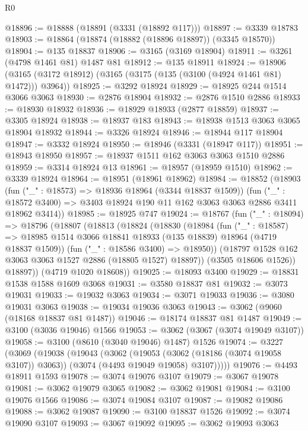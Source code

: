 \begin{lexlean}{R0}
\begin{coremodule}
@18896 := @18888 (@18891 (@3331 (@18892 @117)))
@18897 := @3339 @18783
@18903 := @18864 (@18874 (@18882 (@18896 @18897)) (@3345 @18570))
@18904 := @135 @18837
@18906 := @3165 (@3169 @18904)
@18911 := @3261 (@4798 @1461 @81) @1487 @81
@18912 := @135 @18911
@18924 := @18906 (@3165 (@3172 @18912) (@3165 (@3175 (@135 (@3100 (@4924 @1461 @81) @1472))) @3964))
@18925 := @3292 @18924
@18929 := @18925 @244 @1514 @3066 @3063
@18930 := @2876 @18904
@18932 := @2876 @1510 @2886
@18933 := @18930 @18932
@18936 := @18929 @18933 (@2877 @18859)
@18937 := @3305 @18924
@18938 := @18937 @183
@18943 := @18938 @1513 @3063 @3065 @18904 @18932
@18944 := @3326 @18924
@18946 := @18944 @117 @18904
@18947 := @3332 @18924
@18950 := @18946 (@3331 (@18947 @117))
@18951 := @18943 @18950
@18957 := @18937 @1511 @162 @3063 @3063 @1510 @2886
@18959 := @3314 @18924 @13
@18961 := @18957 (@18959 @1510)
@18962 := @3339 @18924
@18964 := @18951 (@18961 @18962)
@18984 := @18852
    (@18903
      (fun ("_" : @18573) => @18936 @18964 (@3344 @18837 @1509))
      (fun ("_" : @18572 @3400) => @3403 @18924 @190 @11 @162 @3063 @3063 @2886 @3411 @18962 @3414))
@18985 := @18925 @747
@19024 := @18767
    (fun ("_" : @18094) =>
    @18796
      (@18807
        (@18813
          (@18824
            (@18830
              (@18984
                (fun ("_" : @18587) =>
                @18985 @1514 @3066 @18841 @18933 (@135 @18839) @18964 (@4719 @18837 @1509))
                (fun ("_" : @18586 @3400) => @18950))
              (@18797 @1528 @162 @3063 @3063 @1527 @2886 (@18805 @1527) @18897))
            (@3505 @18606 @1526))
          @18897))
      (@4719 @1020 @18608))
@19025 := @18093 @3400
@19029 := @18831 @1538 @1588 @1609 @3068
@19031 := @3580 @18837 @81
@19032 := @3073 @19031
@19033 := @19032 @3063
@19034 := @3071 @19033
@19036 := @3080 @19031 @3063
@19038 := @19034 @19036 @3063
@19043 := @3062 (@9060 (@18168 @18837 @81 @1487))
@19046 := @18174 @18837 @81 @1487
@19049 := @3100 (@3036 @19046) @1566
@19053 := @3062 (@3067 (@3074 @19049 @3107))
@19058 := @3100 (@8610 (@3040 @19046) @1487) @1526
@19074 := @3227
    (@3069
      (@19038
        (@19043
          (@3062
            (@19053 (@3062 (@18186 (@3074 @19058 @3107)) @3063))
            (@3074 (@4493 @19049 @19058) @3107)))))
@19076 := @4493 @18911 @1593
@19078 := @3074 @19076 @3107
@19079 := @3067 @19078
@19081 := @3062 @19079 @3065
@19082 := @3062 @19081
@19084 := @3100 @19076 @1566
@19086 := @3074 @19084 @3107
@19087 := @19082 @19086
@19088 := @3062 @19087
@19090 := @3100 @18837 @1526
@19092 := @3074 @19090 @3107
@19093 := @3067 @19092
@19095 := @3062 @19093 @3063

\end{coremodule}
\end{lexlean}
